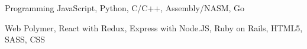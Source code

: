


\begin{cvskills}


\cvskill
{Programming} %
{JavaScript, Python, C/C++, Assembly/NASM, Go}


\cvskill
{Web} %
{Polymer, React with Redux, Express with Node.JS, Ruby on Rails, HTML5, SASS, CSS} %


\end{cvskills}
